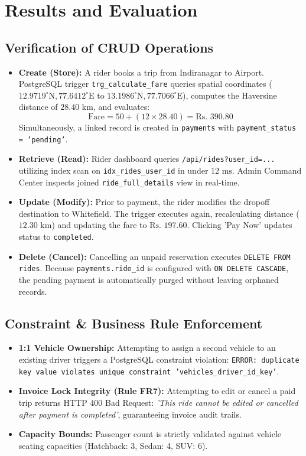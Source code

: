\chapter{Results and Evaluation}

\section{Verification of CRUD Operations}
\begin{itemize}[itemsep=2pt, topsep=2pt, parsep=0pt]
    \item \textbf{Create (Store):} A rider books a trip from Indiranagar to Airport. PostgreSQL trigger \texttt{trg\_calculate\_fare} queries spatial coordinates ($12.9719^\circ\text{N}, 77.6412^\circ\text{E}$ to $13.1986^\circ\text{N}, 77.7066^\circ\text{E}$), computes the Haversine distance of $28.40\text{ km}$, and evaluates:
    $$\text{Fare} = 50 + (12 \times 28.40) = \text{Rs. } 390.80$$
    Simultaneously, a linked record is created in \texttt{payments} with \texttt{payment\_status = 'pending'}.
    \item \textbf{Retrieve (Read):} Rider dashboard queries \texttt{/api/rides?user\_id=...} utilizing index scan on \texttt{idx\_rides\_user\_id} in under $12\text{ ms}$. Admin Command Center inspects joined \texttt{ride\_full\_details} view in real-time.
    \item \textbf{Update (Modify):} Prior to payment, the rider modifies the dropoff destination to Whitefield. The trigger executes again, recalculating distance ($12.30\text{ km}$) and updating the fare to $\text{Rs. } 197.60$. Clicking 'Pay Now' updates status to \texttt{completed}.
    \item \textbf{Delete (Cancel):} Cancelling an unpaid reservation executes \texttt{DELETE FROM rides}. Because \texttt{payments.ride\_id} is configured with \texttt{ON DELETE CASCADE}, the pending payment is automatically purged without leaving orphaned records.
\end{itemize}

\section{Constraint \& Business Rule Enforcement}
\begin{itemize}[itemsep=2pt, topsep=2pt, parsep=0pt]
    \item \textbf{1:1 Vehicle Ownership:} Attempting to assign a second vehicle to an existing driver triggers a PostgreSQL constraint violation:
    \texttt{ERROR: duplicate key value violates unique constraint 'vehicles\_driver\_id\_key'}.
    \item \textbf{Invoice Lock Integrity (Rule FR7):} Attempting to edit or cancel a paid trip returns HTTP 400 Bad Request: \textit{'This ride cannot be edited or cancelled after payment is completed'}, guaranteeing invoice audit trails.
    \item \textbf{Capacity Bounds:} Passenger count is strictly validated against vehicle seating capacities (Hatchback: 3, Sedan: 4, SUV: 6).
\end{itemize}

